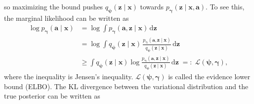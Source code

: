 so maximizing the bound pushes \(q_{\boldsymbol{\psi}}(\mathbf{z}\mid \mathbf{x})\) 
towards \(p_{\boldsymbol{\gamma}}(\mathbf{z}\mid \mathbf{x},\mathbf{a})\). To see this, 
the marginal likelihood can be written as
\begin{align}
\log p_{\boldsymbol{\gamma}}(\mathbf{a}\mid \mathbf{x})
&= \log \int p_{\boldsymbol{\gamma}}(\mathbf{a},\mathbf{z}\mid \mathbf{x})\,\mathrm{d}\mathbf{z}
\nonumber\\
&= \log \int q_{\boldsymbol{\psi}}(\mathbf{z}\mid \mathbf{x})\,
\frac{p_{\boldsymbol{\gamma}}(\mathbf{a},\mathbf{z}\mid \mathbf{x})}{q_{\boldsymbol{\psi}}(\mathbf{z}\mid \mathbf{x})}\,
\mathrm{d}\mathbf{z}
\nonumber\\
&\ge \int q_{\boldsymbol{\psi}}(\mathbf{z}\mid \mathbf{x})
\log\frac{p_{\boldsymbol{\gamma}}(\mathbf{a},\mathbf{z}\mid \mathbf{x})}{q_{\boldsymbol{\psi}}(\mathbf{z}\mid \mathbf{x})}\,
\mathrm{d}\mathbf{z}
\;=:\; \mathcal{L}(\boldsymbol{\psi},\boldsymbol{\gamma}),
\label{eq:elbo-def}
\end{align}
where the inequality is Jensen's inequality. $\mathcal{L}(\boldsymbol{\psi},\boldsymbol{\gamma})$ 
is called the evidence lower bound (ELBO). The KL divergence 
between the variational distribution and the true posterior can be written as

